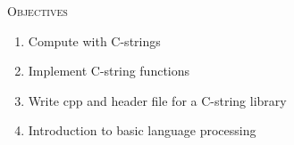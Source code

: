 
\textsc{Objectives}
 \begin{enumerate}
 \item Compute with C-strings
 \item Implement C-string functions
 \item Write cpp and header file for a C-string library
 \item Introduction to basic language processing
 \end{enumerate}
